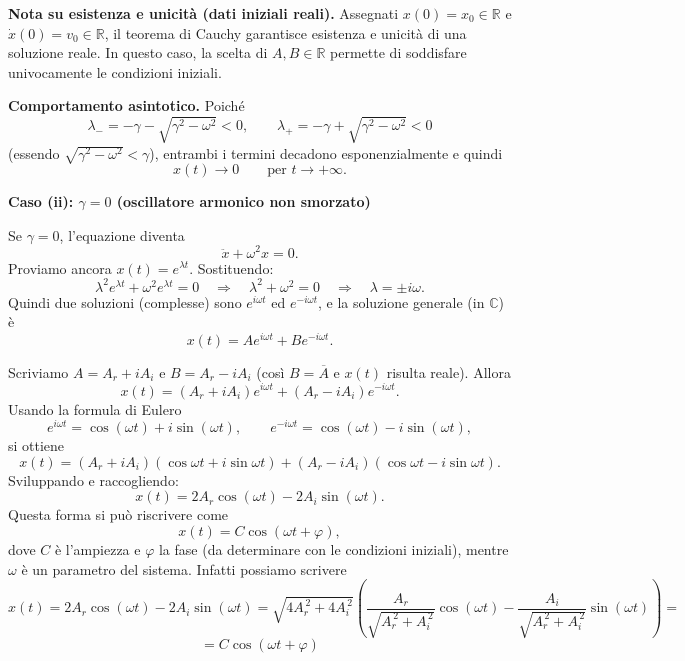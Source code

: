 \medskip
\textbf{Nota su esistenza e unicità (dati iniziali reali).}
Assegnati \(x(0)=x_0\in\mathbb{R}\) e \(\dot x(0)=v_0\in\mathbb{R}\), il teorema di Cauchy garantisce esistenza e unicità di una soluzione reale.
In questo caso, la scelta di \(A,B\in\mathbb{R}\) permette di soddisfare univocamente le condizioni iniziali.

\medskip
\textbf{Comportamento asintotico.}
Poiché
\[
\lambda_-=-\gamma-\sqrt{\gamma^2-\omega^2}<0,
\qquad
\lambda_+=-\gamma+\sqrt{\gamma^2-\omega^2}<0
\]
(essendo \(\sqrt{\gamma^2-\omega^2}<\gamma\)), entrambi i termini decadono esponenzialmente e quindi
\[
x(t)\to 0 \qquad \text{per } t\to+\infty.
\]

\begin{center}
\end{center}


\textbf{Caso (ii): \(\gamma=0\) (oscillatore armonico non smorzato)}

Se \(\gamma=0\), l'equazione diventa
\[
\ddot x+\omega^2 x=0.
\]
Proviamo ancora \(x(t)=e^{\lambda t}\). Sostituendo:
\[
\lambda^2 e^{\lambda t}+\omega^2 e^{\lambda t}=0
\quad\Rightarrow\quad
\lambda^2+\omega^2=0
\quad\Rightarrow\quad
\lambda=\pm i\omega.
\]
Quindi due soluzioni (complesse) sono \(e^{i\omega t}\) ed \(e^{-i\omega t}\), e la soluzione generale (in \(\mathbb{C}\)) è
\[
x(t)=A e^{i\omega t}+B e^{-i\omega t}.
\]

Scriviamo \(A=A_r+iA_i\) e \(B=A_r-iA_i\) (così \(B=\overline{A}\) e \(x(t)\) risulta reale). Allora
\[
x(t)=(A_r+iA_i)e^{i\omega t}+(A_r-iA_i)e^{-i\omega t}.
\]
Usando la formula di Eulero
\[
e^{i\omega t}=\cos(\omega t)+i\sin(\omega t),
\qquad
e^{-i\omega t}=\cos(\omega t)-i\sin(\omega t),
\]
si ottiene
\[
x(t)=(A_r+iA_i)(\cos\omega t+i\sin\omega t)+(A_r-iA_i)(\cos\omega t-i\sin\omega t).
\]
Sviluppando e raccogliendo:
\[
x(t)=2A_r\cos(\omega t)-2A_i\sin(\omega t).
\]
Questa forma si può riscrivere come
\[
x(t)=C\cos(\omega t+\varphi),
\]
dove \(C\) è l'ampiezza e \(\varphi\) la fase (da determinare con le condizioni iniziali), mentre \(\omega\) è un parametro del sistema. Infatti possiamo scrivere
\[
x(t)=2A_r\cos(\omega t)-2A_i\sin(\omega t)
=\sqrt{4A_r^{\,2}+4A_i^{\,2}}
\left(
\frac{A_r}{\sqrt{A_r^{\,2}+A_i^{\,2}}}\cos(\omega t)
-\frac{A_i}{\sqrt{A_r^{\,2}+A_i^{\,2}}}\sin(\omega t)
\right)=
\]
\[
= C\cos(\omega t+\varphi)
\]

